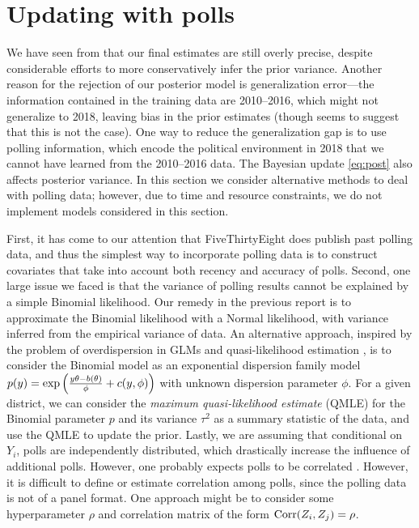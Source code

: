 \documentclass[12pt]{article}
\newcommand{\cm}{{\color{Red}{\textsf{[C]}}}}
\begin{document}
\section{Updating with polls}
\label{sec:polls}
We have seen from  that our final estimates are still overly
precise, despite considerable efforts to more conservatively infer the prior
variance. Another reason for the rejection of our posterior model is
generalization error---the information contained in the training data are
2010--2016, which might not generalize to 2018, leaving bias in the prior
estimates (though  seems to suggest that this is not the
case). One way to reduce the generalization gap is to use polling information,
which encode the political environment in 2018 that we cannot have learned from
the 2010--2016 data. The Bayesian update \eqref{eq:post} also affects posterior
variance. In this section we consider alternative methods to deal with polling
data; however, due to time and resource constraints, we do not implement models considered in this section.

First, it has come to our attention that FiveThirtyEight does publish past
polling data, and thus the simplest way to incorporate polling data is to
construct covariates that take into account both recency and accuracy of polls.
Second, one large issue we faced is that the variance of polling results cannot
be explained by a simple Binomial likelihood. Our remedy in the previous report
is to approximate the Binomial likelihood with a Normal likelihood, with
variance inferred from the empirical variance of data. An alternative approach,
inspired by the problem of overdispersion in GLMs and quasi-likelihood
estimation \citep[][Chapter 8]{agresti2015foundations}, is to consider the
Binomial model as an exponential dispersion family model $p(y) =
\exp\left({\frac{y\theta - b(\theta)}{\phi} + c(y, \phi)}\right)$ with unknown dispersion
parameter $\phi$. For a given district, we can consider the \emph{maximum
quasi-likelihood estimate} (QMLE) \citep{agresti2015foundations} for the
Binomial parameter $p$ and its variance $\tau^2$ as a summary statistic of the
data, and use the QMLE to update the prior. Lastly, we are assuming that
conditional on $Y_i$, polls are independently distributed, which drastically
increase the influence of additional polls. However, one probably expects polls
to be correlated \cm{}. However, it is difficult to define or estimate
correlation among polls, since the polling data is not of a panel format. One
approach might be to consider some hyperparameter $\rho$ and correlation matrix
of the form $\operatorname{Corr}(Z_i,Z_j) = \rho$.
\end{document}
